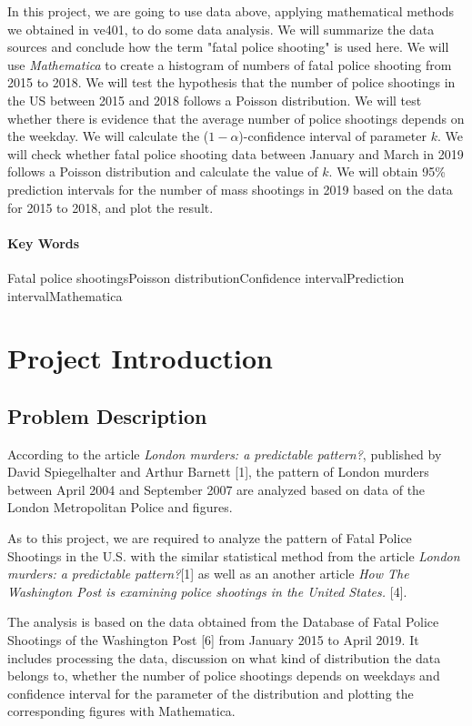\documentclass[a4paper]{article}
\begin{document}
In this project, we are going to use data above, applying mathematical methods we obtained in ve401, to do some data analysis. We will summarize the data sources and conclude how the term "fatal police shooting" is used here. We will use \textit{Mathematica} to create a histogram of numbers of fatal police shooting from 2015 to 2018. We will test the hypothesis that the number of police shootings in the US between 2015 and 2018 follows a Poisson distribution. We will test whether there is evidence that the
average number of police shootings depends on the weekday. We will calculate the ($1-\alpha$)-confidence interval of parameter $k$. We will check whether fatal police shooting data between January and March in 2019 follows a Poisson distribution and calculate the value of $k$. We will obtain 95\% prediction intervals for the
number of mass shootings in 2019 based on the data for 2015 to 2018, and plot the result.

\paragraph{Key Words}
Fatal police shootings\quad Poisson distribution\quad Confidence interval\quad Prediction interval\quad Mathematica


\newpage
\tableofcontents
\newpage
\listoffigures
\listoftables
\newpage
\section{Project Introduction}
\subsection{Problem Description}
According to the article \textit{London murders: a predictable pattern?}, published by David Spiegelhalter and Arthur Barnett [1], the pattern of London murders between April 2004 and September 2007 are analyzed based on data of the London Metropolitan Police and figures. 

As to this project, we are required to analyze the pattern of Fatal Police Shootings in the U.S. with the similar statistical method from the article \textit{London murders: a predictable pattern?}[1] as well as an another article \textit{How The Washington Post is examining police shootings in the United States.} [4].

The analysis is based on the data obtained from the Database of Fatal Police Shootings of the Washington Post [6] from January 2015 to April 2019. It includes processing the data, discussion on what kind of distribution the data belongs to, whether the number of police shootings depends on weekdays and confidence interval for the parameter of the distribution and plotting the corresponding figures with Mathematica.
\end{document}
